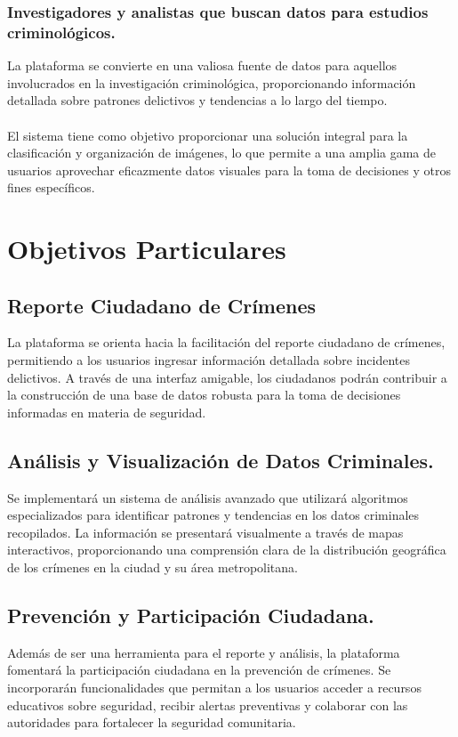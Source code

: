 \documentclass{article}
\begin{document}
        \subsubsection{Investigadores y analistas que buscan datos para estudios criminológicos.}
        La plataforma se convierte en una valiosa fuente de datos para aquellos involucrados en la investigación criminológica, proporcionando información detallada sobre patrones delictivos y tendencias a lo largo del tiempo.
        \\\\
        El sistema tiene como objetivo proporcionar una solución integral para la clasificación y organización de imágenes, lo que permite a una amplia gama de usuarios aprovechar eficazmente datos visuales para la toma de decisiones y otros fines específicos.

\section{Objetivos Particulares}
    \subsection{Reporte Ciudadano de Crímenes}
    La plataforma se orienta hacia la facilitación del reporte ciudadano de crímenes, permitiendo a los usuarios ingresar información detallada sobre incidentes delictivos. A través de una interfaz amigable, los ciudadanos podrán contribuir a la construcción de una base de datos robusta para la toma de decisiones informadas en materia de seguridad.

    \subsection{Análisis y Visualización de Datos Criminales.}
    Se implementará un sistema de análisis avanzado que utilizará algoritmos especializados para identificar patrones y tendencias en los datos criminales recopilados. La información se presentará visualmente a través de mapas interactivos, proporcionando una comprensión clara de la distribución geográfica de los crímenes en la ciudad y su área metropolitana.

    \subsection{Prevención y Participación Ciudadana.}
    Además de ser una herramienta para el reporte y análisis, la plataforma fomentará la participación ciudadana en la prevención de crímenes. Se incorporarán funcionalidades que permitan a los usuarios acceder a recursos educativos sobre seguridad, recibir alertas preventivas y colaborar con las autoridades para fortalecer la seguridad comunitaria.
\end{document}
